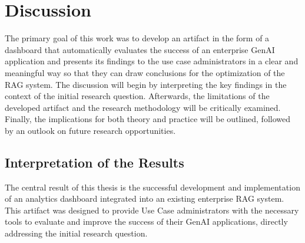 \documentclass[
	english,
	ruledheaders=section,%
	class=report,%
	thesis={type=bachelor},%
	accentcolor=1b,%
	custommargins=true,%
	marginpar=false,%
	parskip=half-,%
	fontsize=11pt,%
	DIV=14,
]{tudapub}
\begin{document}
\chapter{Discussion}
The primary goal of this work was to develop an artifact in the form of a dashboard that automatically evaluates the success of an enterprise GenAI application and presents its findings to the use case administrators in a clear and meaningful way so that they can draw conclusions for the optimization of the RAG system. The discussion will begin by interpreting the key findings in the context of the initial research question. Afterwards, the limitations of the developed artifact and the research methodology will be critically examined. Finally, the implications for both theory and practice will be outlined, followed by an outlook on future research opportunities.

\section{Interpretation of the Results}
The central result of this thesis is the successful development and implementation of an analytics dashboard integrated into an existing enterprise RAG system. This artifact was designed to provide Use Case administrators with the necessary tools to evaluate and improve the success of their GenAI applications, directly addressing the initial research question.
\end{document}

